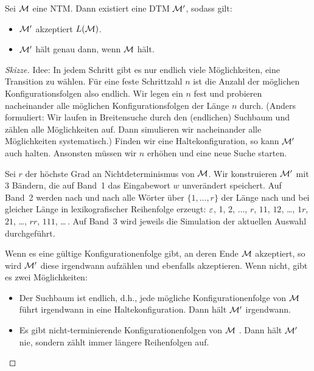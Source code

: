 \begin{Satz}\label{satz:Ntm2Dtm}
	Sei $\mathcal{M}$ eine \ac{NTM}.
	Dann existiert eine \ac{DTM} $\mathcal{M}'$, sodass gilt:
	\begin{itemize}
	\item $\mathcal{M}'$ akzeptiert $L(\mathcal{M})$.
	\item $\mathcal{M}'$ hält genau dann, wenn $\mathcal{M}$ hält.
	\qedhere
	\end{itemize}
\end{Satz}

\begin{proof}[Skizze]
Idee: In jedem Schritt gibt es nur endlich viele Möglichkeiten, eine Transition zu wählen.
Für eine feste Schrittzahl $n$ ist die Anzahl der möglichen Konfigurationsfolgen also endlich.
Wir legen ein $n$ fest und probieren nacheinander alle möglichen Konfigurationsfolgen der Länge $n$ durch.
(Anders formuliert: Wir laufen in Breitensuche durch den (endlichen) Suchbaum und zählen alle Möglichkeiten auf.
Dann simulieren wir nacheinander alle Möglichkeiten systematisch.)
Finden wir eine Haltekonfiguration, so kann $\mathcal{M}'$ auch halten.
Ansonsten müssen wir $n$ erhöhen und eine neue Suche starten.

Sei $r$ der höchste Grad an Nichtdeterminismus von $\mathcal{M}$.
Wir konstruieren $\mathcal{M}'$ mit 3 Bändern, die auf Band~1 das Eingabewort $w$ unverändert speichert.
Auf Band~2 werden nach und nach alle Wörter über $\{1, \dots, r\}$ der Länge nach und bei gleicher Länge in lexikografischer Reihenfolge erzeugt: $\varepsilon$, 1, 2, $\dots$, $r$, $11$, $12$, \dots, $1r$, $21$, \dots, $rr$, $111$, \dots\,.
Auf Band~3 wird jeweils die Simulation der aktuellen Auswahl durchgeführt.

Wenn es eine gültige Konfigurationenfolge gibt, an deren Ende $\mathcal{M}$ akzeptiert, so wird $\mathcal{M}'$ diese irgendwann aufzählen und ebenfalls akzeptieren.
Wenn nicht, gibt es zwei Möglichkeiten:
%
\begin{itemize}
 \item Der Suchbaum ist endlich, d.h., jede mögliche Konfigurationenfolge von $\mathcal{M}$ führt irgendwann in eine Haltekonfiguration.
 Dann hält $\mathcal{M}'$ irgendwann.
 \item Es gibt nicht-terminierende Konfigurationenfolgen von $\mathcal{M}$ .
 Dann hält $\mathcal{M}'$ nie, sondern zählt immer längere Reihenfolgen auf.
 \qedhere
\end{itemize}
\end{proof}

